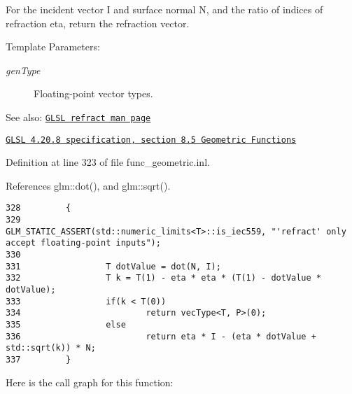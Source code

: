 For the incident vector I and surface normal N, and the ratio of indices of refraction eta, return the refraction vector.

\begin{Desc}
\item[Template Parameters:]
\begin{description}
\item[{\em genType}]Floating-point vector types.\end{description}
\end{Desc}
\begin{Desc}
\item[See also:]\href{http://www.opengl.org/sdk/docs/manglsl/xhtml/refract.xml}{\tt GLSL refract man page} 

\href{http://www.opengl.org/registry/doc/GLSLangSpec.4.20.8.pdf}{\tt GLSL 4.20.8 specification, section 8.5 Geometric Functions} \end{Desc}


Definition at line 323 of file func\_\-geometric.inl.

References glm::dot(), and glm::sqrt().

\begin{Code}\begin{verbatim}328         {
329                 GLM_STATIC_ASSERT(std::numeric_limits<T>::is_iec559, "'refract' only accept floating-point inputs");
330 
331                 T dotValue = dot(N, I);
332                 T k = T(1) - eta * eta * (T(1) - dotValue * dotValue);
333                 if(k < T(0))
334                         return vecType<T, P>(0);
335                 else
336                         return eta * I - (eta * dotValue + std::sqrt(k)) * N;
337         }
\end{verbatim}
\end{Code}




Here is the call graph for this function: